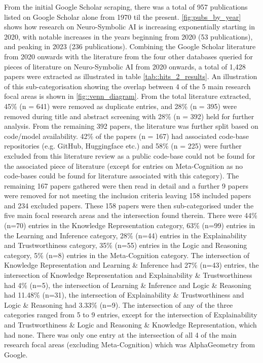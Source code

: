 \documentclass[hf]{ceurart}
\begin{document}
From the initial Google Scholar scraping, there was a total of 957 publications listed on Google Scholar alone from 1970 til the present. \autoref{fig:pubs_by_year} shows how research on Neuro-Symbolic AI is increasing exponentially starting in 2020, with notable increases in the years beginning from 2020 (53 publications), and peaking in 2023 (236 publications). Combining the Google Scholar literature from 2020 onwards with the literature from the four other databases queried for pieces of literature on Neuro-Symbolic AI from 2020 onwards, a total of 1,428 papers were extracted as illustrated in table \ref{tab::hits_2_results}. An illustration of this sub-categorisation showing the overlap between 4 of the 5 main research focal areas is shown in \autoref{fig::venn_diagram}. From the total literature extracted, 45\% (n = 641) were removed as duplicate entries, and 28\% (n = 395) were removed during title and abstract screening with 28\% (n = 392) held for further analysis. From the remaining 392 papers, the literature was further split based on code/model availability. 42\% of the papers (n = 167) had associated code-base repositories (e.g. GitHub, Huggingface etc.) and 58\% (n = 225) were further excluded from this literature review as a public code-base could not be found for the associated piece of literature (except for entries on Meta-Cognition as no code-bases could be found for literature associated with this category). The remaining 167 papers gathered were then read in detail and a further 9 papers were removed for not meeting the inclusion criteria leaving 158 included papers and 234 excluded papers. These 158 papers were then sub-categorised under the five main focal research areas and the intersection found therein. There were 44\% (n=70) entries in the Knowledge Representation category, 63\% (n=99) entries in the Learning and Inference category, 28\% (n=44) entries in the Explainability and Trustworthiness category, 35\% (n=55) entries in the Logic and Reasoning category, 5\% (n=8) entries in the Meta-Cognition category. The intersection of Knowledge Representation and Learning \& Inference had 27\% (n=43) entries, the intersection of Knowledge Representation and Explainability \& Trustworthiness had 4\% (n=5), the intersection of Learning \& Inference and Logic \& Reasoning had 11.48\% (n=31), the intersection of Explainability \& Trustworthiness and Logic \& Reasoning had 3.33\% (n=9). The intersection of any of the three categories ranged from 5 to 9 entries, except for the intersection of Explainability and Trustworthiness \& Logic and Reasoning \& Knowledge Representation, which had none. There was only one entry at the intersection of all 4 of the main research focal areas (excluding Meta-Cognition) which was AlphaGeometry from Google\cite{Trinh2024}. 
\end{document}
